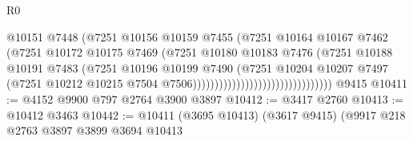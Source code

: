 \begin{lexlean}{R0}
\begin{coremodule}
                                                    @10151
                                                    @7448
                                                    (@7251
                                                      @10156
                                                      @10159
                                                      @7455
                                                      (@7251
                                                        @10164
                                                        @10167
                                                        @7462
                                                        (@7251
                                                          @10172
                                                          @10175
                                                          @7469
                                                          (@7251
                                                            @10180
                                                            @10183
                                                            @7476
                                                            (@7251
                                                              @10188
                                                              @10191
                                                              @7483
                                                              (@7251
                                                                @10196
                                                                @10199
                                                                @7490
                                                                (@7251
                                                                  @10204
                                                                  @10207
                                                                  @7497
                                                                  (@7251
                                                                    @10212
                                                                    @10215
                                                                    @7504
                                                                    @7506))))))))))))))))))))))))))))))))
    @9415
@10411 := @4152 @9900 @797 @2764 @3900 @3897
@10412 := @3417 @2760
@10413 := @10412 @3463
@10442 := @10411
    (@3695 @10413)
    (@3617 @9415)
    (@9917
      @218
      @2763
      @3897
      @3899
      @3694
      @10413

\end{coremodule}
\end{lexlean}

